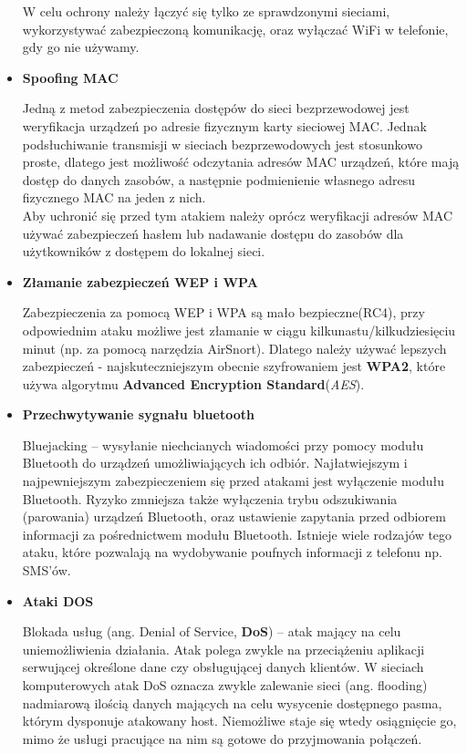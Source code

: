 \begin{itemize}
	W celu ochrony należy łączyć się tylko ze sprawdzonymi sieciami, wykorzystywać zabezpieczoną komunikację, oraz wyłączać WiFi w telefonie, gdy go nie używamy. \\

	\item \textbf{Spoofing MAC}

	Jedną z metod zabezpieczenia dostępów do sieci bezprzewodowej jest weryfikacja urządzeń po adresie fizycznym karty sieciowej MAC. Jednak podsłuchiwanie transmisji w sieciach bezprzewodowych jest stosunkowo proste, dlatego jest możliwość odczytania adresów MAC urządzeń, które mają dostęp do danych zasobów, a następnie podmienienie własnego adresu fizycznego MAC na jeden z nich. \\
	
	Aby uchronić się przed tym atakiem należy oprócz weryfikacji adresów MAC używać zabezpieczeń hasłem lub nadawanie dostępu do zasobów dla użytkowników z dostępem do lokalnej sieci.

	\item \textbf{Złamanie zabezpieczeń WEP i WPA}

	Zabezpieczenia za pomocą WEP i WPA są mało bezpieczne(RC4), przy odpowiednim ataku możliwe jest złamanie w ciągu kilkunastu/kilkudziesięciu minut (np. za pomocą narzędzia AirSnort). Dlatego należy używać lepszych zabezpieczeń - najskuteczniejszym obecnie szyfrowaniem jest \textbf{WPA2}, które używa algorytmu \textbf{Advanced Encryption Standard}(\textit{AES}). \\

	\item \textbf{Przechwytywanie sygnału bluetooth}

	Bluejacking – wysyłanie niechcianych wiadomości przy pomocy modułu Bluetooth do urządzeń umożliwiających ich odbiór. Najłatwiejszym i najpewniejszym zabezpieczeniem się przed atakami jest wyłączenie modułu Bluetooth. Ryzyko zmniejsza także wyłączenia trybu odszukiwania (parowania) urządzeń Bluetooth, oraz ustawienie zapytania przed odbiorem informacji za pośrednictwem modułu Bluetooth. Istnieje wiele rodzajów tego ataku, które pozwalają na wydobywanie poufnych informacji z telefonu np. SMS'ów. \\

	\item \textbf{Ataki DOS}

	Blokada usług (ang. Denial of Service, \textbf{DoS}) – atak mający na celu uniemożliwienia działania. Atak polega zwykle na przeciążeniu aplikacji serwującej określone dane czy obsługującej danych klientów. W sieciach komputerowych atak DoS oznacza zwykle zalewanie sieci (ang. flooding) nadmiarową ilością danych mających na celu wysycenie dostępnego pasma, którym dysponuje atakowany host. Niemożliwe staje się wtedy osiągnięcie go, mimo że usługi pracujące na nim są gotowe do przyjmowania połączeń.
\\

\end{itemize}

